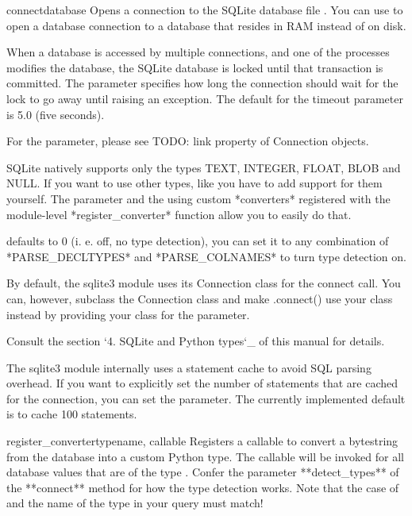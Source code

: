 \begin{funcdesc}{connect}{database}
Opens a connection to the SQLite database file . You can use
 to open a database connection to a database that resides in
RAM instead of on disk.

When a database is accessed by multiple connections, and one of the processes
modifies the database, the SQLite database is locked until that transaction is
committed. The  parameter specifies how long the connection should
wait for the lock to go away until raising an exception. The default for the
timeout parameter is 5.0 (five seconds). 

For the  parameter, please see TODO: link property of
Connection objects.

SQLite natively supports only the types TEXT, INTEGER, FLOAT, BLOB and NULL. If
you want to use other types, like you have to add support for them yourself.
The  parameter and the using custom *converters* registered with
the module-level *register_converter* function allow you to easily do that.

 defaults to 0 (i. e. off, no type detection), you can set it
to any combination of *PARSE_DECLTYPES* and *PARSE_COLNAMES* to turn type
detection on.

By default, the sqlite3 module uses its Connection class for the connect call.
You can, however, subclass the Connection class and make .connect() use your
class instead by providing your class for the  parameter.

Consult the section `4. SQLite and Python types`_ of this manual for details.

The sqlite3 module internally uses a statement cache to avoid SQL parsing
overhead. If you want to explicitly set the number of statements that are
cached for the connection, you can set the  parameter.
The currently implemented default is to cache 100 statements.
\end{funcdesc}

\begin{funcdesc}{register_converter}{typename, callable}
Registers a callable to convert a bytestring from the database into a custom
Python type. The callable will be invoked for all database values that are of
the type . Confer the parameter **detect_types** of the
**connect** method for how the type detection works. Note that the case of
 and the name of the type in your query must match!
\end{funcdesc}

